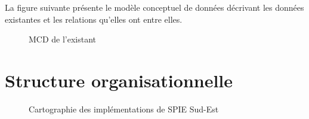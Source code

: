 La figure suivante présente le modèle conceptuel de données décrivant les données existantes et les relations qu'elles ont entre elles.

\begin{figure}[H]
    \label{fig-mcd-existant}
    \noindent{}
    \caption{MCD de l'existant}
\end{figure}

\section{Structure organisationnelle}

\begin{figure}[H]
    \label{fig-implem-spie}
    \noindent{}
    \caption{Cartographie des implémentations de SPIE Sud-Est}
\end{figure}

